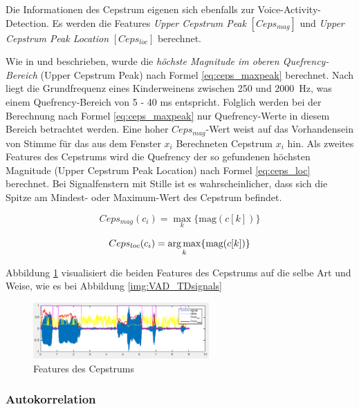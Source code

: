 Die Informationen des Cepstrum eigenen sich ebenfalls zur Voice-Activity-Detection. Es werden die Features \emph{Upper Cepstrum Peak} $[ Ceps_{mag} ]$ und \emph{Upper Cepstrum Peak Location} $[ Ceps_{loc} ]$ berechnet.

Wie in \cite{vad_ceps} und \cite{vad_Lisboa} beschrieben, wurde die \emph{höchste Magnitude im oberen Quefrency-Bereich} (Upper Cepstrum Peak) nach Formel \ref{eq:ceps_maxpeak} berechnet. Nach \cite{lod} liegt die Grundfrequenz eines Kinderweinens zwischen 250 und \SI{2000}{\hertz}, was einem Quefrency-Bereich von 5 - 40 ms entspricht. Folglich werden bei der Berechnung nach Formel \ref{eq:ceps_maxpeak} nur Quefrency-Werte in diesem Bereich betrachtet werden. Eine hoher $Ceps_{mag}$-Wert weist auf das Vorhandensein von Stimme für das aus dem Fenster $x_i$ Berechneten Cepstrum $x_i$ hin. Als zweites Features des Cepstrums wird die Quefrency der so gefundenen höchsten Magnitude (Upper Cepstrum Peak Location) nach Formel \ref{eq:ceps_loc} berechnet. Bei Signalfenstern mit Stille ist es wahrscheinlicher, dass sich die Spitze am Mindest- oder Maximum-Wert des Cepstrum befindet. 

\begin{equation}
Ceps_{mag}(c_i) = \max_{k}\{\text{mag}(c[k])\}
\label{eq:ceps_maxpeak}
\end{equation}

\begin{equation}
Ceps_{loc}(c_i) = \operatorname*{arg\,max}_{k}\{\text{mag}(c[k])\}
\label{eq:ceps_loc}
\end{equation}

Abbildung \ref{img:VAD_CeDsignals} visualisiert die beiden Features des Cepstrums auf die selbe Art und Weise, wie es bei Abbildung \ref{img:VAD_TDsignals}

\begin{figure}[h]
	\centering
	\includegraphics[width=0.6\textwidth]{bilder/VAD_CeDsignals.png}
	\caption{Features des Cepstrums}
	\label{img:VAD_CeDsignals}
\end{figure}

\subsubsection{Autokorrelation}

